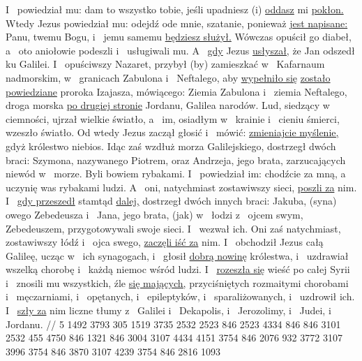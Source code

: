  I~ powiedział mu: dam to wszystko tobie, jeśli upadniesz (i) \underline{oddasz} mi \underline{pokłon.}
 Wtedy Jezus powiedział mu: odejdź ode mnie, szatanie, ponieważ \underline{jest napisane:} Panu, twemu Bogu,  i~ jemu samemu \underline{będziesz służył.}
 Wówczas opuścił go diabeł, a~ oto aniołowie podeszli i~ usługiwali mu.
 A~ \underline{gdy} Jezus \underline{usłyszał,} że Jan  odszedł ku Galilei.
 I~ opuściwszy Nazaret, przybył (by) zamieszkać w~ Kafarnaum nadmorskim, w~ granicach Zabulona i~ Neftalego,
 aby \underline{wypełniło się}  \underline{zostało powiedziane}  proroka Izajasza, mówiącego:
 Ziemia Zabulona i~ ziemia Neftalego, droga morska \underline{po drugiej stronie} Jordanu, Galilea narodów.
 Lud, siedzący w~ ciemności, ujrzał wielkie światło, a~ im, osiadłym w~ krainie i~ cieniu śmierci, wzeszło światło.
 Od wtedy Jezus zaczął głosić i~ mówić: \underline{zmieniajcie myślenie,} gdyż  królestwo niebios.
 Idąc zaś wzdłuż morza Galilejskiego, dostrzegł dwóch braci: Szymona, nazywanego Piotrem, oraz Andrzeja, jego brata, zarzucających niewód w~ morze. Byli bowiem rybakami.
 I~ powiedział im: chodźcie za mną, a~ uczynię was rybakami ludzi.
 A~ oni, natychmiast zostawiwszy sieci, \underline{poszli za} nim.
 I~ \underline{gdy przeszedł} stamtąd \underline{dalej,} dostrzegł dwóch innych braci: Jakuba, (syna) owego Zebedeusza i~ Jana, jego brata, (jak) w~ łodzi z~ ojcem swym, Zebedeuszem, przygotowywali swoje sieci. I~ wezwał ich.
 Oni zaś natychmiast, zostawiwszy łódź i~ ojca swego, \underline{zaczęli iść za} nim.
 I~ obchodził Jezus całą Galileę, ucząc w~ ich synagogach, i~ głosił \underline{dobrą nowinę} królestwa, i~ uzdrawiał wszelką chorobę i~ każdą niemoc wśród ludzi.
 I~ \underline{rozeszła się} wieść  po całej Syrii i~ znosili mu wszystkich, źle \underline{się mających,} przyciśniętych rozmaitymi chorobami i~ męczarniami, i~ opętanych, i~ epileptyków, i~ sparaliżowanych, i~ uzdrowił ich.
 I~ \underline{szły za} nim liczne tłumy z~ Galilei i~ Dekapolis, i~ Jerozolimy, i~ Judei, i~  Jordanu.
//
\endgl
\begingl
\lettrine[loversize=1,lraise=-1.3]{5 }{}%
 1492 3793 305 1519 3735 2532 2523 846 2523 4334 846 846 3101
{} 2532 455 4750 846 1321 846 3004
{} 3107 4434 4151 3754 846 2076 932 3772
{} 3107 3996 3754 846 3870
{} 3107 4239 3754 846 2816 1093
